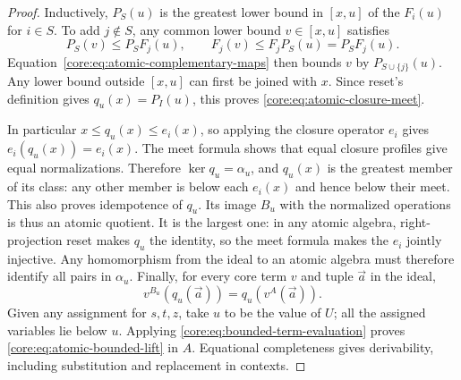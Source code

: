 \begin{proof}
Inductively, $P_S(u)$ is the greatest lower bound in $[x,u]$ of the
$F_i(u)$ for $i\in S$. To add $j\notin S$, any common lower bound $v\in[x,u]$
satisfies
\[
 P_S(v)\leq P_SF_j(u),\qquad
 F_j(v)\leq F_jP_S(u)=P_SF_j(u).
\]
Equation~\eqref{core:eq:atomic-complementary-maps} then bounds $v$
by $P_{S\cup\{j\}}(u)$. Any lower bound outside $[x,u]$ can first
be joined with $x$. Since reset's definition gives
$q_u(x)=P_I(u)$, this proves \eqref{core:eq:atomic-closure-meet}.

In particular $x\leq q_u(x)\leq e_i(x)$, so applying the closure
operator $e_i$ gives $e_i(q_u(x))=e_i(x)$. The meet formula shows
that equal closure profiles give equal normalizations. Therefore
$\ker q_u=\alpha_u$, and $q_u(x)$ is the greatest member of its
class: any other member is below each $e_i(x)$ and hence below their
meet. This also proves idempotence of $q_u$. Its image $B_u$ with the
normalized operations is thus an atomic quotient.
It is the largest one: in any atomic algebra, right-projection reset
makes $q_u$ the identity, so the meet formula makes the $e_i$ jointly
injective. Any homomorphism from the ideal to an atomic algebra must
therefore identify all pairs in $\alpha_u$.
Finally, for every core term $v$ and tuple $\vec a$ in the ideal,
\begin{equation}\label{core:eq:bounded-term-evaluation}
 v^{B_u}(q_u(\vec a))=q_u(v^A(\vec a)).
\end{equation}
Given any assignment for $s,t,z$, take $u$ to be the value of $U$;
all the assigned variables lie below $u$. Applying
\eqref{core:eq:bounded-term-evaluation} proves
\eqref{core:eq:atomic-bounded-lift} in $A$. Equational completeness
gives derivability, including substitution and replacement in contexts.
\end{proof}
